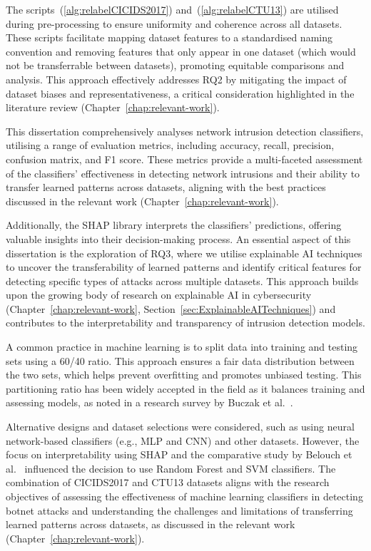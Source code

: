 The scripts~(\ref{alg:relabelCICIDS2017}) and~(\ref{alg:relabelCTU13}) are utilised during pre-processing to ensure uniformity and coherence across all datasets. These scripts facilitate mapping dataset features to a standardised naming convention and removing features that only appear in one dataset (which would not be transferrable between datasets), promoting equitable comparisons and analysis. This approach effectively addresses RQ2 by mitigating the impact of dataset biases and representativeness, a critical consideration highlighted in the literature review (Chapter~\ref{chap:relevant-work}).

This dissertation comprehensively analyses network intrusion detection classifiers, utilising a range of evaluation metrics, including accuracy, recall, precision, confusion matrix, and F1 score. These metrics provide a multi-faceted assessment of the classifiers' effectiveness in detecting network intrusions and their ability to transfer learned patterns across datasets, aligning with the best practices discussed in the relevant work (Chapter~\ref{chap:relevant-work}).

Additionally, the SHAP library interprets the classifiers' predictions, offering valuable insights into their decision-making process. An essential aspect of this dissertation is the exploration of RQ3, where we utilise explainable AI techniques to uncover the transferability of learned patterns and identify critical features for detecting specific types of attacks across multiple datasets. This approach builds upon the growing body of research on explainable AI in cybersecurity (Chapter~\ref{chap:relevant-work}, Section~\ref{sec:ExplainableAITechniques}) and contributes to the interpretability and transparency of intrusion detection models.

A common practice in machine learning is to split data into training and testing sets using a 60/40 ratio. This approach ensures a fair data distribution between the two sets, which helps prevent overfitting and promotes unbiased testing. This partitioning ratio has been widely accepted in the field as it balances training and assessing models, as noted in a research survey by Buczak et al.~\cite{buczak2015survey}.

Alternative designs and dataset selections were considered, such as using neural network-based classifiers (e.g., MLP and CNN) and other datasets. However, the focus on interpretability using SHAP and the comparative study by Belouch et al.~\cite{belouch2018performance} influenced the decision to use Random Forest and SVM classifiers. The combination of CICIDS2017 and CTU13 datasets aligns with the research objectives of assessing the effectiveness of machine learning classifiers in detecting botnet attacks and understanding the challenges and limitations of transferring learned patterns across datasets, as discussed in the relevant work (Chapter~\ref{chap:relevant-work}).

